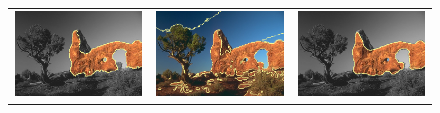 \documentclass[smallextended]{svjour3}       %
\begin{document}
{{\begin{figure}[hp!]
\begin{tabular}{ccc}
		\includegraphics[scale=0.2]{segmentation_bc_rock_gc-seg.png} &
		\includegraphics[scale=0.2]{segmentation_schoenemann_rock_rock-seg.png} &
		\includegraphics[scale=0.2]{segmentation_bc_rock_corrected-seg.png} \\		

\end{tabular}
\end{figure}}}
\end{document}
